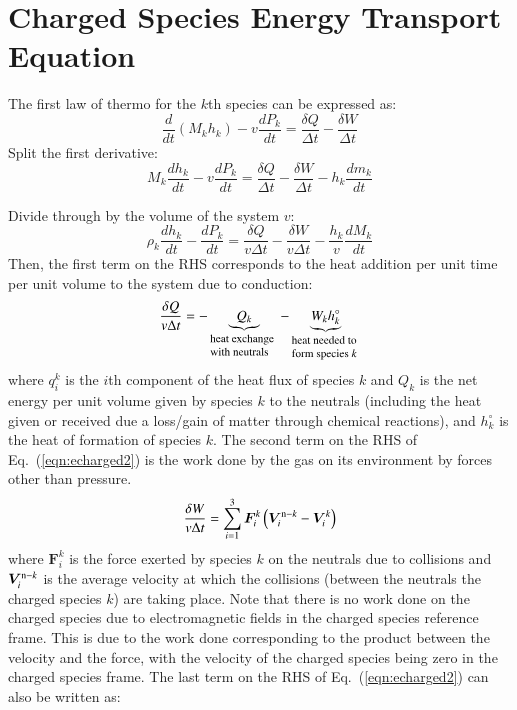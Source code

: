\documentclass{warpdoc}
\renewcommand{\vec}[1]{\bm{#1}}
\begin{document}
\section{Charged Species Energy Transport Equation}


The first law of thermo for the $k$th species can be expressed as:
%
\begin{equation}
 \frac{d }{d t}\left(M_k h_k\right) - v \frac{d P_k}{dt} = \frac{\delta Q}{\Delta t}-\frac{\delta W}{\Delta t}
\end{equation}
%
Split the first derivative:
%
\begin{equation}
 M_k\frac{d h_k}{d t} - v \frac{d P_k}{dt} = \frac{\delta Q}{\Delta t}-\frac{\delta W}{\Delta t}-h_k\frac{d m_k}{d t}
\end{equation}
%
  
Divide through by the volume of the system $v$:
%
\begin{equation}
\rho_k \frac{d h_k}{d t} -  \frac{d P_k}{dt} = \frac{\delta Q}{v \Delta t}-\frac{\delta W}{v \Delta t}
-\frac{h_k}{v}\frac{d M_k}{d t}
\label{eqn:echarged2}
\end{equation}
%  
Then, the first term on the RHS corresponds to the heat addition per unit time per unit volume to the system due to conduction:
%
\begin{equation}
\frac{\delta Q}{v \Delta t}= 
-
\underbrace{
Q_k
}_{\begin{minipage}{1.7cm}\flushleft \footnotesize heat exchange with neutrals\end{minipage}}
-
\underbrace{
W_k h_k^\circ
}_{\begin{minipage}{1.7cm}\flushleft \footnotesize heat needed to form species $k$ \end{minipage}}
\end{equation}
%
where $q^k_i$ is the $i$th component of the heat flux of species $k$ and $Q_{k}$ is the net energy per unit volume given by species $k$ to the neutrals (including the heat given or received due a loss/gain of matter through chemical reactions), and $h_k^\circ$ is the heat of formation of species $k$. The second term on the RHS of Eq.\ (\ref{eqn:echarged2}) is the work done by the gas on its environment by forces other than pressure. 
%
\begin{equation}
\frac{\delta W}{v \Delta t}= \sum_{i=1}^3 \vec{F}_i^k \left( \vec{V}_i^{{\rm n}-k}-\vec{V}_i^k \right)
\end{equation}
%
where $\vec{F}_i^k$ is the force exerted by species $k$ on the neutrals due to collisions and $\vec{V}_i^{{\rm n}-k}$ is the average velocity at which the collisions (between the neutrals the charged species $k$) are taking place. Note that there is no work done on the charged species due to electromagnetic fields in the charged species reference frame. This is due to the work done corresponding to the product between the velocity and the force, with the velocity of the charged species being zero in the charged species frame.  The last term on the RHS of Eq.\ (\ref{eqn:echarged2}) can also be written as:
\end{document}
